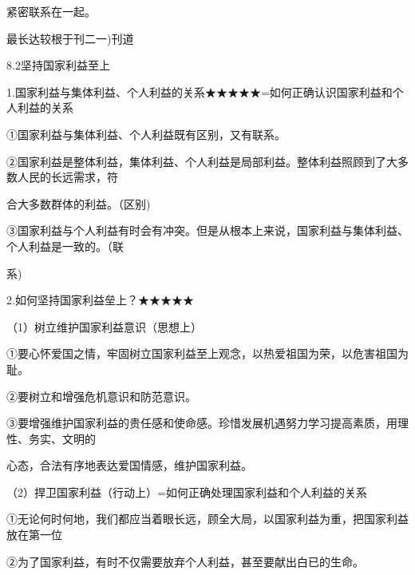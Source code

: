 \documentclass[lang=cn,11pt]{elegantbook}
\newcommand{\daofasym}[1]{{\daofasymbolfont #1}}
\newcommand{\daofasym}[1]{#1}
\begin{document}
紧密联系在一起。\par

最长达较根于刊二一)刊道\par

8.2坚持国家利益至上\par

1.国家利益与集体利益、个人利益的关系\daofasym{★}\daofasym{★}\daofasym{★}\daofasym{★}\daofasym{★}=如何正确认识国家利益和个人利益的关系\par

\daofasym{①}国家利益与集体利益、个人利益既有区别，又有联系。\par

\daofasym{②}国家利益是整体利益，集体利益、个人利益是局部利益。整体利益照顾到了大多数人民的长远需求，符\par

合大多数群体的利益。（区别)\par

\daofasym{③}国家利益与个人利益有时会有冲突。但是从根本上来说，国家利益与集体利益、个人利益是一致的。（联\par

系)\par

2.如何坚持国家利益垒上？\daofasym{★}\daofasym{★}\daofasym{★}\daofasym{★}\daofasym{★}\par

（1）树立维护国家利益意识（思想上）\par

\daofasym{①}要心怀爱国之情，牢固树立国家利益至上观念，以热爱祖国为荣，以危害祖国为耻。\par

\daofasym{②}要树立和增强危机意识和防范意识。\par

\daofasym{③}要增强维护国家利益的贵任感和使命感。珍惜发展机遇努力学习提高素质，用理性、务实、文明的\par

心态，合法有序地表达爱国情感，维护国家利益。\par

（2）捍卫国家利益（行动上）=如何正确处理国家利益和个人利益的关系\par

\daofasym{①}无论何时何地，我们都应当着眼长远，顾全大局，以国家利益为重，把国家利益放在第一位\par

\daofasym{②}为了国家利益，有时不仅需要放弃个人利益，甚至要献出白已的生命。\par
\end{document}

